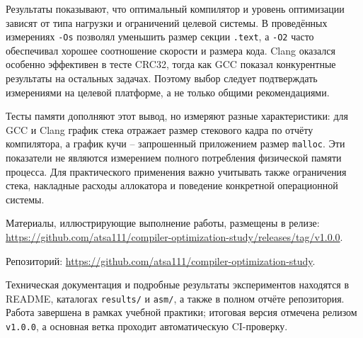 \documentclass[a4paper]{article}
\begin{document}
Результаты показывают, что оптимальный компилятор и уровень оптимизации зависят от типа нагрузки и ограничений целевой системы. В проведённых измерениях \texttt{-Os} позволял уменьшить размер секции \texttt{.text}, а \texttt{-O2} часто обеспечивал хорошее соотношение скорости и размера кода. Clang оказался особенно эффективен в тесте CRC32, тогда как GCC показал конкурентные результаты на остальных задачах. Поэтому выбор следует подтверждать измерениями на целевой платформе, а не только общими рекомендациями.

Тесты памяти дополняют этот вывод, но измеряют разные характеристики: для GCC и Clang график стека отражает размер стекового кадра по отчёту компилятора, а график кучи -- запрошенный приложением размер \texttt{malloc}. Эти показатели не являются измерением полного потребления физической памяти процесса. Для практического применения важно учитывать также ограничения стека, накладные расходы аллокатора и поведение конкретной операционной системы.

Материалы, иллюстрирующие выполнение работы, размещены в релизе: \url{https://github.com/atsa111/compiler-optimization-study/releases/tag/v1.0.0}.

Репозиторий: \url{https://github.com/atsa111/compiler-optimization-study}.

Техническая документация и подробные результаты экспериментов находятся в README, каталогах \texttt{results/} и \texttt{asm/}, а также в полном отчёте репозитория. Работа завершена в рамках учебной практики; итоговая версия отмечена релизом \texttt{v1.0.0}, а основная ветка проходит автоматическую CI-проверку.
\end{document}
